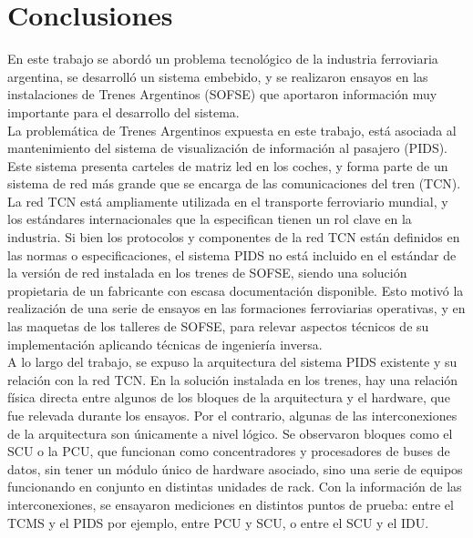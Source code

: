 
\chapter{Conclusiones} %

En este trabajo se abordó un problema tecnológico de la industria ferroviaria argentina, se desarrolló un sistema embebido, y se realizaron ensayos en las instalaciones de Trenes Argentinos (SOFSE) que aportaron información muy importante para el desarrollo del sistema.\\

La problemática de Trenes Argentinos expuesta en este trabajo, está asociada al mantenimiento del sistema de visualización de información al pasajero (PIDS). Este sistema presenta carteles de matriz led en los coches, y forma parte de un sistema de red más grande que se encarga de las comunicaciones del tren (TCN). La red TCN está ampliamente utilizada en el transporte ferroviario mundial, y los estándares internacionales que la especifican tienen un rol clave en la industria. Si bien los protocolos y componentes de la red TCN están definidos en las normas o especificaciones, el sistema PIDS no está incluido en el estándar de la versión de red instalada en los trenes de SOFSE, siendo una solución propietaria de un fabricante con escasa documentación disponible. Esto motivó la realización de una serie de ensayos en las formaciones ferroviarias operativas, y en las maquetas de los talleres de SOFSE, para relevar aspectos técnicos de su implementación aplicando técnicas de ingeniería inversa.\\

A lo largo del trabajo, se expuso la arquitectura del sistema PIDS existente y su relación con la red TCN. En la solución instalada en los trenes, hay una relación física directa entre algunos de los bloques de la arquitectura y el hardware, que fue relevada durante los ensayos. Por el contrario, algunas de las interconexiones de la arquitectura son únicamente a nivel lógico. Se observaron bloques como el SCU o la PCU, que funcionan como concentradores y procesadores de buses de datos, sin tener un módulo único de hardware asociado, sino una serie de equipos funcionando en conjunto en distintas unidades de rack.  Con la información de las interconexiones, se ensayaron mediciones en distintos puntos de prueba: entre el TCMS y el PIDS por ejemplo, entre PCU y SCU, o entre el SCU y el IDU. \\

